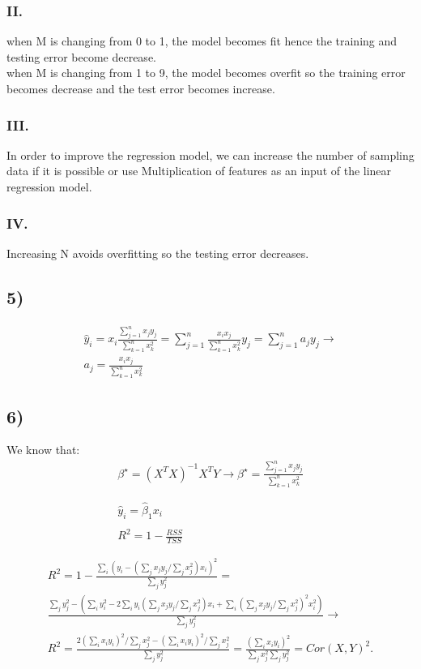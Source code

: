 \documentclass[12pt]{article}
\begin{document}
\subsubsection{II.}
when M is changing from 0 to 1, the model becomes fit hence the training and testing error become decrease. \\
when M is changing from 1 to 9, the model becomes overfit so the training error becomes decrease and the test error becomes increase.
\subsubsection{III.}
In order to improve the regression model, we can increase the number of sampling data if it is possible or use Multiplication of features as an input of the linear regression model.
\subsubsection{IV.}
Increasing N avoids overfitting so the testing error decreases.
\subsection{5)}
\begin{equation*}
\begin{split}
\hat{y}_i = x_i\frac{\sum_{j=1}^n x_jy_j}{\sum_{k=1}^nx_k^2} = \sum_{j=1}^n\frac{x_ix_j}{\sum_{k=1}^nx_k^2}y_j = \sum_{j=1}^na_jy_j \rightarrow \\
a_j=\frac{x_ix_j}{\sum_{k=1}^nx_k^2}
\end{split}
\end{equation*}
\subsection{6)}
We know that:
\begin{equation*}
\begin{split}
\beta^{\star}=(X^{T}X)^{-1}X^{T}Y \rightarrow  
\beta^{\star}=\frac{\sum_{j=1}^n x_jy_j}{\sum_{k=1}^nx_k^2}\\\\\\
\hat{y}_i = \hat{\beta}_1x_i\\\\
R^2 = 1 - \frac{RSS}{TSS}\\\\
\end{split}
\end{equation*}
\begin{equation*}
\begin{split}
R^2 = 1 - \frac{\sum_i(y_i - (\sum_jx_jy_j/\sum_jx_j^2) x_i)^2}{\sum_jy_j^2} =\\ \frac{\sum_jy_j^2 - (\sum_iy_i^2 - 2\sum_iy_i(\sum_jx_jy_j/\sum_jx_j^2)x_i + \sum_i(\sum_jx_jy_j/\sum_jx_j^2)^2x_i^2)}{\sum_jy_j^2} \rightarrow \\
R^2 = \frac{2(\sum_ix_iy_i)^2/\sum_jx_j^2 - (\sum_ix_iy_i)^2/\sum_jx_j^2}{\sum_jy_j^2} = \frac{(\sum_ix_iy_i)^2}{\sum_jx_j^2\sum_jy_j^2} = Cor(X, Y)^2.
\end{split}
\end{equation*}
\end{document}

